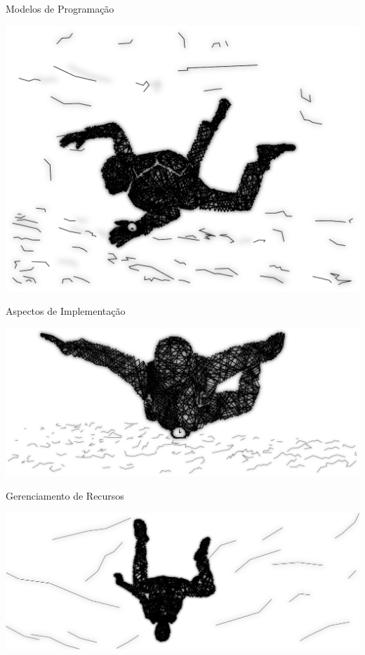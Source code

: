 \documentclass[xcolor={usenames,svgnames,dvipsnames},brazil,english,12pt,aspectratio=149]{beamer}
\begin{document}
\begin{frame}{Modelos de Programação}
\end{frame}

\begin{frame}[plain]
	\centering
  \includegraphics[width=\textwidth]{presentation_sec_seven}
\end{frame}

\begin{frame}{Aspectos de Implementação}
\end{frame}

\begin{frame}[plain]
	\centering
  \includegraphics[width=\textwidth]{presentation_sec_eight}
\end{frame}

\begin{frame}{Gerenciamento de Recursos}
\end{frame}

\begin{frame}[plain]
	\centering
  \includegraphics[width=\textwidth]{presentation_sec_nine}
\end{frame}
\end{document}

